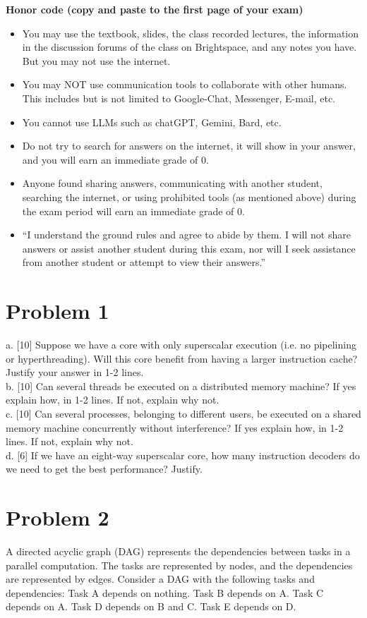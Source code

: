 \documentclass{article}
\begin{document}
\textbf{Honor code (copy and paste to the first page of your exam)}
\begin{itemize}
    \item You may use the textbook, slides, the class recorded lectures, the information in the discussion forums of the class on Brightspace, and any notes you have. But you may not use the internet.
    \item You may NOT use communication tools to collaborate with other humans. This includes but is not limited to Google-Chat, Messenger, E-mail, etc.
    \item You cannot use LLMs such as chatGPT, Gemini, Bard, etc.
    \item Do not try to search for answers on the internet, it will show in your answer, and you will earn an immediate grade of 0.
    \item Anyone found sharing answers, communicating with another student, searching the internet, or using prohibited tools (as mentioned above) during the exam period will earn an immediate grade of 0.
    \item ``I understand the ground rules and agree to abide by them. I will not share answers or assist another student during this exam, nor will I seek assistance from another student or attempt to view their answers.''
\end{itemize}

\section*{Problem 1}
a. [10] Suppose we have a core with only superscalar execution (i.e. no pipelining or hyperthreading). Will this core benefit from having a larger instruction cache? Justify your answer in 1-2 lines. \\
b. [10] Can several threads be executed on a distributed memory machine? If yes explain how, in 1-2 lines. If not, explain why not. \\
c. [10] Can several processes, belonging to different users, be executed on a shared memory machine concurrently without interference? If yes explain how, in 1-2 lines. If not, explain why not. \\
d. [6] If we have an eight-way superscalar core, how many instruction decoders do we need to get the best performance? Justify.

\section*{Problem 2}
A directed acyclic graph (DAG) represents the dependencies between tasks in a parallel computation.  The tasks are represented by nodes, and the dependencies are represented by edges. Consider a DAG with the following tasks and dependencies:
Task A depends on nothing.
Task B depends on A.
Task C depends on A.
Task D depends on B and C.
Task E depends on D.
\end{document}
